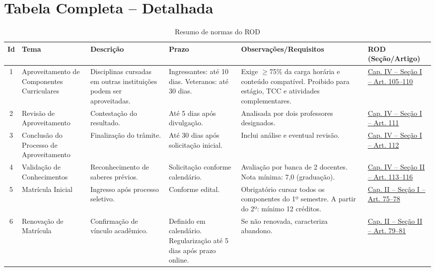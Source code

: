 \documentclass[authoryear]{elsarticle}
\begin{document}
	\section*{Tabela Completa – Detalhada}
	\scriptsize
	
	\begin{longtable}{|c|p{3cm}|p{3cm}|p{3.5cm}|p{3.5cm}|p{2cm}|}  
		\caption{Resumo de normas do ROD\label{tab:prazos_rod}} \\
		\hline 
		\textbf{Id} & \textbf{Tema} & \textbf{Descrição} & \textbf{Prazo} & \textbf{Observações/Requisitos} & \textbf{ROD (Seção/Artigo)} \\
		\hline
		1 & Aproveitamento de Componentes Curriculares & Disciplinas cursadas em outras instituições podem ser aproveitadas. & Ingressantes: até 10 dias. Veteranos: até 30 dias. & Exige $\geq$75\% da carga horária e conteúdo compatível. Proibido para estágio, TCC e atividades complementares. & \href{https://github.com/JonathaCosta-IA/CCECA/blob/main/02_Rod_atualizado1.pdf}{Cap. IV – Seção I – Art. 105--110} \\
		\hline
		2 & Revisão de Aproveitamento & Contestação do resultado. & Até 5 dias após divulgação. & Analisada por dois professores designados. & \href{https://github.com/JonathaCosta-IA/CCECA/blob/main/02_Rod_atualizado1.pdf}{Cap. IV – Seção I – Art. 111} \\
		\hline
		3 & Conclusão do Processo de Aproveitamento & Finalização do trâmite. & Até 30 dias após solicitação inicial. & Inclui análise e eventual revisão. & \href{https://github.com/JonathaCosta-IA/CCECA/blob/main/02_Rod_atualizado1.pdf}{Cap. IV – Seção I – Art. 112} \\
		\hline
		4 & Validação de Conhecimentos & Reconhecimento de saberes prévios. & Solicitação conforme calen\-dário. & Avaliação por banca de 2 docentes. Nota mínima: 7,0 (graduação). & \href{https://github.com/JonathaCosta-IA/CCECA/blob/main/02_Rod_atualizado1.pdf}{Cap. IV – Seção II – Art. 113--116} \\
		\hline
		5 & Matrícula Inicial & Ingresso após processo seletivo. & Conforme edital. & Obrigatório cursar todos os componentes do 1º semestre. A partir do 2º: mínimo 12 créditos. & \href{https://github.com/JonathaCosta-IA/CCECA/blob/main/02_Rod_atualizado1.pdf}{Cap. II – Seção I – Art. 75--78} \\
		\hline
		6 & Renovação de Matrícula & Confirmação de vínculo acadêmico. & Definido em calendário. Regularização até 5 dias após prazo online. & Se não renovada, caracteriza abandono. & \href{https://github.com/JonathaCosta-IA/CCECA/blob/main/02_Rod_atualizado1.pdf}{Cap. II – Seção II – Art. 79--81} \\

\end{longtable}
\end{document}
